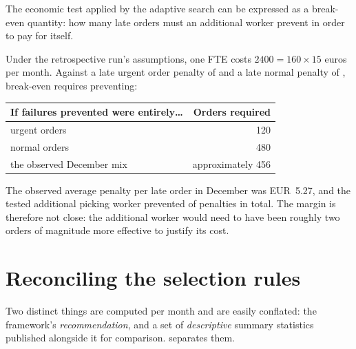 The economic test applied by the adaptive search can be expressed as a break-even quantity: how
many late orders must an additional worker prevent in order to pay for itself.

Under the retrospective run's assumptions, one FTE costs
\(\num{2400} = 160 \times 15\) euros per month. Against a late urgent order penalty of
 and a late normal penalty of , break-even requires preventing:

\begin{center}
\begin{tabular}{lr}
\toprule
\textbf{If failures prevented were entirely\ldots} & \textbf{Orders required} \\
\midrule
urgent orders & 120 \\
normal orders & 480 \\
the observed December mix & approximately 456 \\
\bottomrule
\end{tabular}
\end{center}

The observed average penalty per late order in December was EUR~5.27, and the tested additional
picking worker prevented  of penalties in total. The margin is therefore not close: the
additional worker would need to have been roughly two orders of magnitude more effective to
justify its cost.

\section{Reconciling the selection rules}
\label{sec:app-rules}

Two distinct things are computed per month and are easily conflated: the framework's
\emph{recommendation}, and a set of \emph{descriptive} summary statistics published alongside it
for comparison.  separates them.

